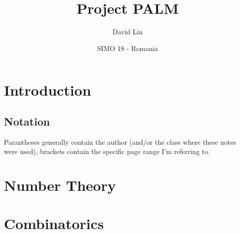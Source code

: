 \documentclass[a4paper]{article}
\begin{document}
%
\title{Project PALM}
\author{David Lin}
\date{SIMO 18 - Romania}
\maketitle
\section{Introduction}
\subsection{Notation}
\notation Parantheses generally contain the author (and/or the class where these notes were used), brackets contain the specific page range I'm referring to.
\newpage
%

\section{Number Theory}
\section{Combinatorics}
\end{document}
